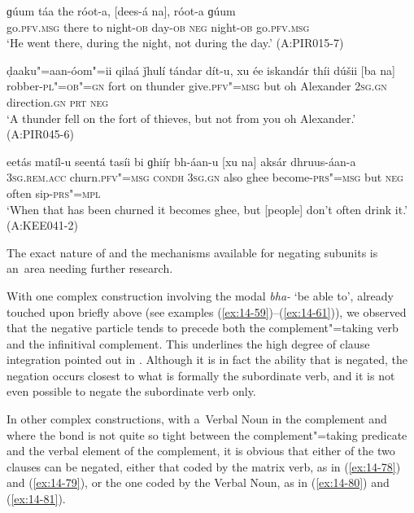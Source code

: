 \begin{exe}
\ex
\label{ex:14-75}
\gll ɡúum táa the róot-a, [dees-á na], róot-a  ɡúum \\
go.\textsc{pfv.msg} there to night-\textsc{ob} day-\textsc{ob} \textsc{neg} night-\textsc{ob}  go.\textsc{pfv.msg}  \\
\glt `He went there, during the night, not during the day.' (A:PIR015-7)

\ex
\label{ex:14-76}
\gll ḍaaku"=aan-óom"=ii qilaá ǰhulí tándar dít-u, xu ée iskandár thíi dúšii [ba na] \\
robber-\textsc{pl"=ob"=gn} fort on thunder give.\textsc{pfv"=msg} but oh Alexander \textsc{2sg.gn} direction.\textsc{gn} \textsc{prt} \textsc{neg} \\
\glt `A thunder fell on the fort of thieves, but not from you oh Alexander.' (A:PIR045-6)

\ex
\label{ex:14-77}
\gll eetás matíl-u seentá tasíi bi ɡhiíṛ  bh-áan-u [xu na] aksár dhruus-áan-a \\
\textsc{3sg.rem.acc} churn.\textsc{pfv"=msg} \textsc{condh} \textsc{3sg.gn} also ghee  become-\textsc{prs"=msg} but \textsc{neg} often sip-\textsc{prs"=mpl}  \\
\glt `When that has been churned it becomes ghee, but [people] don't often drink it.' (A:KEE041-2)
\end{exe}

The exact nature of and the mechanisms available for negating subunits is an~area needing further research.


 With one complex construction involving the modal \textit{bha-} `be able to', already touched upon briefly above (see examples (\ref{ex:14-59})--(\ref{ex:14-61})), we observed that the negative particle tends to precede both the complement"=taking verb and the infinitival complement. This underlines the high degree of clause integration pointed out in . Although it is in fact the ability that is negated, the negation occurs closest to what is formally the subordinate verb, and it is not even possible to negate the subordinate verb only.


In other complex constructions, with a~Verbal Noun in the complement and where the bond is not quite so tight between the complement"=taking predicate and the verbal element of the complement, it is obvious that either of the two clauses can be negated, either that coded by the matrix verb, as in (\ref{ex:14-78}) and (\ref{ex:14-79}), or the one coded by the Verbal Noun, as in (\ref{ex:14-80}) and (\ref{ex:14-81}). 

